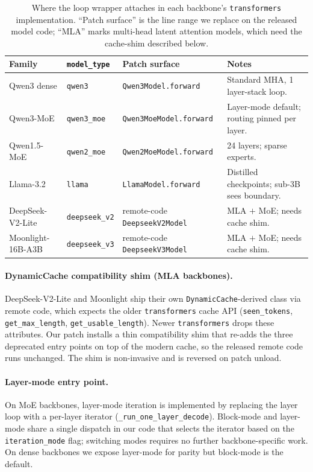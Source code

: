 \begin{table}[h]
\centering
\footnotesize
\setlength{\tabcolsep}{6pt}
\caption{Where the loop wrapper attaches in each backbone's \texttt{transformers} implementation. ``Patch surface'' is the line range we replace on the released model code; ``MLA'' marks multi-head latent attention models, which need the cache-shim described below.}
\label{tab:per-arch}
\begin{tabular}{@{}llll@{}}
\toprule
Family & \texttt{model\_type} & Patch surface & Notes \\
\midrule
Qwen3 dense        & \texttt{qwen3}            & \texttt{Qwen3Model.forward}
                   & Standard MHA, 1 layer-stack loop. \\
Qwen3-MoE          & \texttt{qwen3\_moe}       & \texttt{Qwen3MoeModel.forward}
                   & Layer-mode default; routing pinned per layer. \\
Qwen1.5-MoE        & \texttt{qwen2\_moe}       & \texttt{Qwen2MoeModel.forward}
                   & 24 layers; sparse experts. \\
Llama-3.2          & \texttt{llama}            & \texttt{LlamaModel.forward}
                   & Distilled checkpoints; sub-3B sees boundary. \\
DeepSeek-V2-Lite   & \texttt{deepseek\_v2}     & remote-code \texttt{DeepseekV2Model}
                   & MLA $+$ MoE; needs cache shim. \\
Moonlight-16B-A3B  & \texttt{deepseek\_v3}     & remote-code \texttt{DeepseekV3Model}
                   & MLA $+$ MoE; needs cache shim. \\
\bottomrule
\end{tabular}
\end{table}

\paragraph{DynamicCache compatibility shim (MLA backbones).}
DeepSeek-V2-Lite and Moonlight ship their own \texttt{DynamicCache}-derived class via remote code, which expects the older \texttt{transformers} cache API (\texttt{seen\_tokens}, \texttt{get\_max\_length}, \texttt{get\_usable\_length}). Newer \texttt{transformers} drops these attributes. Our patch installs a thin compatibility shim that re-adds the three deprecated entry points on top of the modern cache, so the released remote code runs unchanged. The shim is non-invasive and is reversed on patch unload.

\paragraph{Layer-mode entry point.}
On MoE backbones, layer-mode iteration is implemented by replacing the layer loop with a per-layer iterator (\texttt{\_run\_one\_layer\_decode}). Block-mode and layer-mode share a single dispatch in our code that selects the iterator based on the \texttt{iteration\_mode} flag; switching modes requires no further backbone-specific work. On dense backbones we expose layer-mode for parity but block-mode is the default.

